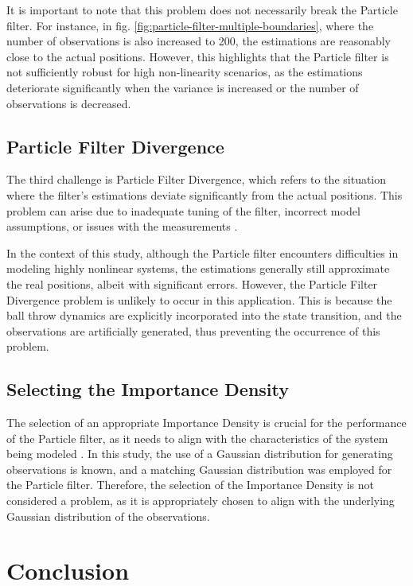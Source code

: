 \documentclass[conference]{IEEEtran}
\begin{document}
It is important to note that this problem does not necessarily break the Particle filter.
For instance, in fig. \ref{fig:particle-filter-multiple-boundaries}, where the number of observations is also increased to 200, the estimations are reasonably close to the actual positions.
However, this highlights that the Particle filter is not sufficiently robust for high non-linearity scenarios, as the estimations deteriorate significantly when the variance is increased or the number of observations is decreased.


\subsection{Particle Filter Divergence}
The third challenge is Particle Filter Divergence, which refers to the situation where the filter's estimations deviate significantly from the actual positions.
This problem can arise due to inadequate tuning of the filter, incorrect model assumptions, or issues with the measurements \cite{b4}.

In the context of this study, although the Particle filter encounters difficulties in modeling highly nonlinear systems, the estimations generally still approximate the real positions, albeit with significant errors.
However, the Particle Filter Divergence problem is unlikely to occur in this application.
This is because the ball throw dynamics are explicitly incorporated into the state transition, and the observations are artificially generated, thus preventing the occurrence of this problem.


\subsection{Selecting the Importance Density}

The selection of an appropriate Importance Density is crucial for the performance of the Particle filter, as it needs to align with the characteristics of the system being modeled \cite{b4}.
In this study, the use of a Gaussian distribution for generating observations is known, and a matching Gaussian distribution was employed for the Particle filter.
Therefore, the selection of the Importance Density is not considered a problem, as it is appropriately chosen to align with the underlying Gaussian distribution of the observations.


\section{Conclusion}
\end{document}
